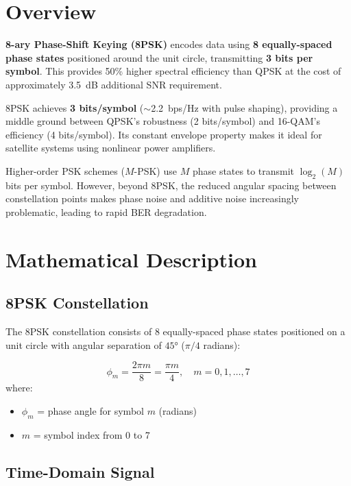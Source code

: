 \section{Overview}

\textbf{8-ary Phase-Shift Keying (8PSK)} encodes data using \textbf{8 equally-spaced phase states} positioned around the unit circle, transmitting \textbf{3 bits per symbol}. This provides 50\% higher spectral efficiency than QPSK at the cost of approximately 3.5~dB additional SNR requirement.

\begin{keyconcept}
8PSK achieves \textbf{3 bits/symbol} ($\sim$2.2~bps/Hz with pulse shaping), providing a middle ground between QPSK's robustness (2 bits/symbol) and 16-QAM's efficiency (4 bits/symbol). Its constant envelope property makes it ideal for satellite systems using nonlinear power amplifiers.
\end{keyconcept}

Higher-order PSK schemes ($M$-PSK) use $M$ phase states to transmit $\log_2(M)$ bits per symbol. However, beyond 8PSK, the reduced angular spacing between constellation points makes phase noise and additive noise increasingly problematic, leading to rapid BER degradation.

\section{Mathematical Description}

\subsection{8PSK Constellation}

The 8PSK constellation consists of 8 equally-spaced phase states positioned on a unit circle with angular separation of $45°$ ($\pi/4$ radians):

\begin{equation}
\phi_m = \frac{2\pi m}{8} = \frac{\pi m}{4}, \quad m = 0, 1, \ldots, 7
\end{equation}
where:
\begin{itemize}
\item $\phi_m$ = phase angle for symbol $m$ (radians)
\item $m$ = symbol index from 0 to 7
\end{itemize}

\subsection{Time-Domain Signal}


